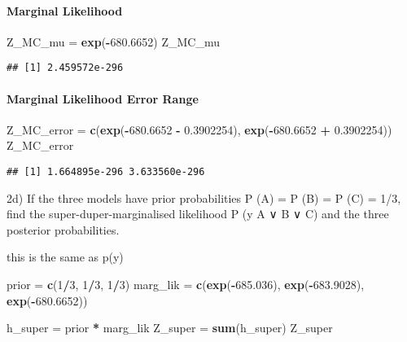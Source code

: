 \documentclass[
]{article}
\newenvironment{Shaded}{\begin{snugshade}}{\end{snugshade}}
\newcommand{\DecValTok}[1]{\textcolor[rgb]{0.00,0.00,0.81}{#1}}
\newcommand{\FloatTok}[1]{\textcolor[rgb]{0.00,0.00,0.81}{#1}}
\newcommand{\FunctionTok}[1]{\textcolor[rgb]{0.13,0.29,0.53}{\textbf{#1}}}
\newcommand{\NormalTok}[1]{#1}
\newcommand{\OtherTok}[1]{\textcolor[rgb]{0.56,0.35,0.01}{#1}}
\newcommand{\SpecialCharTok}[1]{\textcolor[rgb]{0.81,0.36,0.00}{\textbf{#1}}}
\begin{document}
\hypertarget{marginal-likelihood-2}{%
\paragraph{Marginal Likelihood}\label{marginal-likelihood-2}}

\begin{Shaded}
\begin{Highlighting}[]
\NormalTok{Z\_MC\_mu }\OtherTok{=} \FunctionTok{exp}\NormalTok{(}\SpecialCharTok{{-}}\FloatTok{680.6652}\NormalTok{)}
\NormalTok{Z\_MC\_mu}
\end{Highlighting}
\end{Shaded}

\begin{verbatim}
## [1] 2.459572e-296
\end{verbatim}

\hypertarget{marginal-likelihood-error-range-2}{%
\paragraph{Marginal Likelihood Error
Range}\label{marginal-likelihood-error-range-2}}

\begin{Shaded}
\begin{Highlighting}[]
\NormalTok{Z\_MC\_error }\OtherTok{=} \FunctionTok{c}\NormalTok{(}\FunctionTok{exp}\NormalTok{(}\SpecialCharTok{{-}}\FloatTok{680.6652} \SpecialCharTok{{-}} \FloatTok{0.3902254}\NormalTok{), }\FunctionTok{exp}\NormalTok{(}\SpecialCharTok{{-}}\FloatTok{680.6652} \SpecialCharTok{+} \FloatTok{0.3902254}\NormalTok{))}
\NormalTok{Z\_MC\_error}
\end{Highlighting}
\end{Shaded}

\begin{verbatim}
## [1] 1.664895e-296 3.633560e-296
\end{verbatim}

2d) If the three models have prior probabilities P (A) = P (B) = P (C) =
1/3, find the super-duper-marginalised likelihood P (y \textbar{} A ∨ B
∨ C) and the three posterior probabilities.

this is the same as p(y)

\begin{Shaded}
\begin{Highlighting}[]
\NormalTok{prior }\OtherTok{=} \FunctionTok{c}\NormalTok{(}\DecValTok{1}\SpecialCharTok{/}\DecValTok{3}\NormalTok{, }\DecValTok{1}\SpecialCharTok{/}\DecValTok{3}\NormalTok{, }\DecValTok{1}\SpecialCharTok{/}\DecValTok{3}\NormalTok{)}
\NormalTok{marg\_lik }\OtherTok{=} \FunctionTok{c}\NormalTok{(}\FunctionTok{exp}\NormalTok{(}\SpecialCharTok{{-}}\FloatTok{685.036}\NormalTok{), }\FunctionTok{exp}\NormalTok{(}\SpecialCharTok{{-}}\FloatTok{683.9028}\NormalTok{), }\FunctionTok{exp}\NormalTok{(}\SpecialCharTok{{-}}\FloatTok{680.6652}\NormalTok{))}

\NormalTok{h\_super }\OtherTok{=}\NormalTok{ prior }\SpecialCharTok{*}\NormalTok{ marg\_lik}
\NormalTok{Z\_super }\OtherTok{=} \FunctionTok{sum}\NormalTok{(h\_super)}
\NormalTok{Z\_super}
\end{Highlighting}
\end{Shaded}
\end{document}
